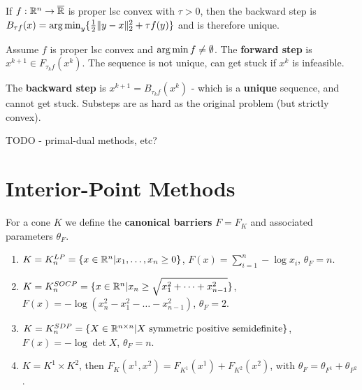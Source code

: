 \begin{thm}
  \label{sec:first-order-methods-2}
  If $f: \mathbb{R}^{n} \rightarrow \overline {\mathbb{R}}$ is proper lsc convex with
  $\tau > 0$, then the backward step is $B_{\tau f}(x) = \operatorname*{arg\,min}_{y}
  \{ \frac{1}{2} \| y - x \|_{2}^{2} + \tau f(y) \} $ and is therefore unique.
\end{thm}

\begin{thm}
  \label{sec:first-order-methods-3}
  Assume $f$ is proper lsc convex and $\operatorname*{arg\,min} f \neq \emptyset$. The
  \textbf{forward step} is $x^{k+1} \in F_{\tau_{k} f}(x^{k})$. The
  sequence is not unique, can get stuck if $x^{k}$ is infeasible.

  The \textbf{backward step} is $x^{k+1} = B_{\tau_{k} f}(x^{k})$ -
  which is a \textbf{unique} sequence, and cannot get stuck.  Substeps
  are as hard as the original problem (but strictly convex).
\end{thm}

TODO - primal-dual methods, etc?

\section{Interior-Point Methods}
\label{sec:inter-point-meth}

\begin{defn}
  \label{sec:inter-point-meth-1}
  For a cone $K$ we define the \textbf{canonical barriers} $F = F_{K}$
  and associated parameters $\theta_{F}$.
  \begin{enumerate}
  \item $K = K^{LP}_{n} = \{ x \in \mathbb{R}^{n} | x_{1}, \dots, x_{n} \geq 0
    \} $, $F(x) = \sum_{i=1}^{n} -\log x_{i}$, $\theta_{F} = n$.
  \item $K = K_{n}^{SOCP} = \{ x \in \mathbb{R}^{n} | x_{n} \geq
    \sqrt{x_{1}^{2} + \cdots + x_{n-1}^{2}}\}$, $F(x) =
    -\log(x_{n}^{2} - x_{1}^{2} - \dots - x_{n-1}^{2})$, $\theta_{F} =
    2$.
  \item $K = K_{n}^{SDP} = \{ X \in \mathbb{R}^{n \times n} | \text{$X$
      symmetric positive semidefinite} \}$, $F(x) = - \log \det X$,
    $\theta_{F} = n$.
  \item $K = K^{1} \times K^{2}$, then $F_{K}(x^{1}, x^{2}) =
    F_{K^{1}}(x^{1}) + F_{K^{2}}(x^{2})$, with $\theta_{F} =
    \theta_{F^{1}} + \theta_{F^{2}}$.
  \end{enumerate}
\end{defn}

